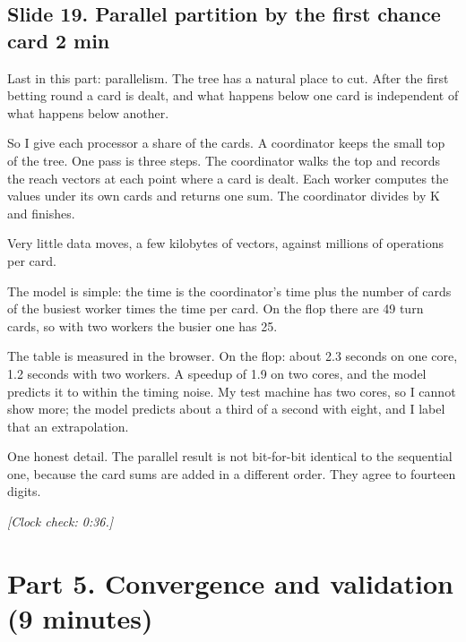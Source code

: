 \documentclass[11pt]{article}
\newcommand{\slidehead}[3]{\subsection*{Slide #1. #2 \hfill {\normalfont\small #3}}}
\newcommand{\cue}[1]{{\small\itshape\color{black!65}[#1]}}
\begin{document}
\slidehead{19}{Parallel partition by the first chance card}{2 min}
\begin{say}
Last in this part: parallelism. The tree has a natural place to cut. After the first betting round a card is
dealt, and what happens below one card is independent of what happens below another.

So I give each processor a share of the cards. A coordinator keeps the small top of the tree. One pass is three
steps. The coordinator walks the top and records the reach vectors at each point where a card is dealt. Each worker
computes the values under its own cards and returns one sum. The coordinator divides by K and finishes.

Very little data moves, a few kilobytes of vectors, against millions of operations per card.

The model is simple: the time is the coordinator's time plus the number of cards of the busiest worker times the
time per card. On the flop there are 49 turn cards, so with two workers the busier one has 25.

The table is measured in the browser. On the flop: about 2.3 seconds on one core, 1.2 seconds with two workers. A
speedup of 1.9 on two cores, and the model predicts it to within the timing noise. My test machine has two cores, so
I cannot show more; the model predicts about a third of a second with eight, and I label that an extrapolation.

One honest detail. The parallel result is not bit-for-bit identical to the sequential one, because the card sums
are added in a different order. They agree to fourteen digits.
\end{say}
\cue{Clock check: 0:36.}

\section{Part 5. Convergence and validation (9 minutes)}
\end{document}
